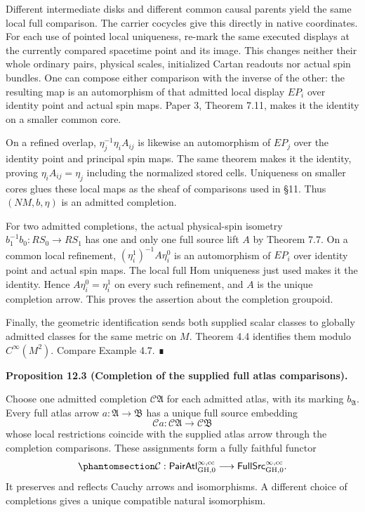 \documentclass[
  english,
  11pt,
  reqno]{amsart}
\makeatletter
\newcommand{\pandocstatementheading}[1]{%
  \par\if@nobreak\else
    \addpenalty{\@beginparpenalty}%
    \addvspace{.5\baselineskip plus .2\baselineskip minus .2\baselineskip}%
  \fi
  {\normalfont\bfseries #1\par}%
  \nobreak\@afterindenttrue\@afterheading
}
\makeatother
\begin{document}
Different intermediate disks and different common causal parents yield
the same local full comparison. The carrier cocycles give this directly
in native coordinates. For each use of pointed local uniqueness, re-mark
the same executed displays at the currently compared spacetime point and
its image. This changes neither their whole ordinary pairs, physical
scales, initialized Cartan readouts nor actual spin bundles. One can
compose either comparison with the inverse of the other: the resulting
map is an automorphism of that admitted local display \(E P_i\) over
identity point and actual spin maps. Paper 3, Theorem 7.11, makes it the
identity on a smaller common core.

On a refined overlap, \(\eta_j^{-1}\eta_i A_{ij}\) is likewise an
automorphism of \(E P_j\) over the identity point and principal spin
maps. The same theorem makes it the identity, proving
\(\eta_i A_{ij}=\eta_j\) including the normalized stored cells.
Uniqueness on smaller cores glues these local maps as the sheaf of
comparisons used in §11. Thus \((N M,b,\eta)\) is an admitted
completion.

For two admitted completions, the actual physical-spin isometry
\(b_1^{-1}b_0:RS_0\to RS_1\) has one and only one full source lift \(A\)
by Theorem 7.7. On a common local refinement,
\((\eta_i^1)^{-1}A\eta_i^0\) is an automorphism of \(E P_i\) over
identity point and actual spin maps. The local full Hom uniqueness just
used makes it the identity. Hence \(A\eta_i^0=\eta_i^1\) on every such
refinement, and \(A\) is the unique completion arrow. This proves the
assertion about the completion groupoid.

Finally, the geometric identification sends both supplied scalar classes
to globally admitted classes for the same metric on \(M\). Theorem 4.4
identifies them modulo \(C^\infty(M^2)\). Compare Example 4.7. ∎

\pandocstatementheading{\protect{}\label{prop:ordinary-atlas-completion-full-hom}Proposition 12.3 (Completion of the supplied full atlas comparisons).}

Choose one admitted completion \(\mathcal C\mathfrak A\) for each
admitted atlas, with its marking \(b_{\mathfrak A}\). Every full atlas
arrow \(a:\mathfrak A\to\mathfrak B\) has a unique full source embedding
\[
\mathcal C a:\mathcal C\mathfrak A\longrightarrow\mathcal C\mathfrak B
\] whose local restrictions coincide with the supplied atlas arrow
through the completion comparisons. These assignments form a fully
faithful functor
\begin{equation}\protect\phantomsection\label{eq:ordinary-atlas-completion-functor}{
\mathcal C:
\mathsf{PairAtl}^{\infty,\mathrm{cc}}_{\mathrm{GH},0}
\longrightarrow
\mathsf{FullSrc}^{\infty,\mathrm{cc}}_{\mathrm{GH},0}.
}\end{equation} It preserves and reflects Cauchy arrows and
isomorphisms. A different choice of completions gives a unique
compatible natural isomorphism.
\end{document}
